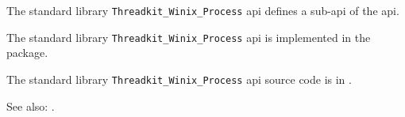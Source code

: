 

The standard library {\tt Threadkit\_Winix\_Process} api defines a sub-api of the  api.

The standard library {\tt Threadkit\_Winix\_Process} api is implemented in the  package.

The standard library {\tt Threadkit\_Winix\_Process} api source code is in .

See also: .


